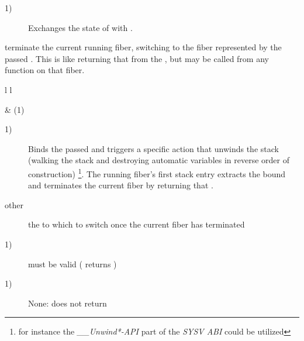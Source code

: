\begin{description}
    \item[1)] Exchanges the state of  with .\\
\end{description}



terminate the current running fiber, switching to the fiber represented by
the passed \fiber. This is like returning that \fiber from the \entryfn, but may
be called from any function on that fiber.

\begin{tabular}{ l l }
    \midrule

     & (1)\\

    \midrule
\end{tabular}

\begin{description}
    \item[1)] Binds the passed \fiber and triggers a specific action that unwinds
              the stack (walking the stack and destroying automatic variables in
              reverse order of construction)
              \footnote{for instance the \emph{\_\_Unwind*-API} part of the
              \emph{SYSV ABI} could be utilized}.
              The running fiber's first stack entry extracts the bound \fiber
              and terminates the current fiber by returning that \fiber.
\end{description}

\begin{description}
    \item[other] the \fiber to which to switch once the current fiber has terminated
\end{description}

\begin{description}
    \item[1)]  must be valid ( returns )
\end{description}

\begin{description}
    \item[1)] None: \unwindfib does not return
\end{description}



